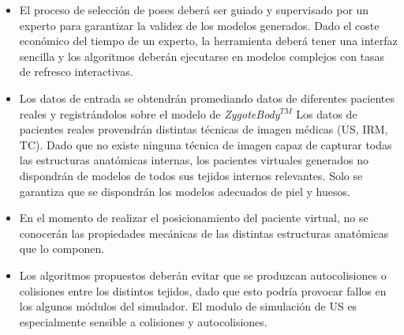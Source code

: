 \begin{itemize}
    \item El proceso de selección de poses deberá ser guiado y supervisado por un experto para garantizar la validez de los modelos generados. Dado el coste económico del tiempo de un experto, la herramienta deberá tener una interfaz sencilla y los algoritmos deberán ejecutarse en modelos complejos con tasas de refresco interactivas.
    \item Los datos de entrada se obtendrán promediando datos de diferentes pacientes reales y registrándolos sobre el modelo de \emph{ZygoteBody}$^{TM}$ \cite{kelc2012zygote} Los datos de pacientes reales provendrán distintas técnicas de imagen médicas (\ac{US}, \ac{IRM}, \ac{TC}). Dado que no existe ninguna técnica de imagen capaz de capturar todas las estructuras anatómicas internas, los pacientes virtuales generados no dispondrán de modelos de todos sus tejidos internos relevantes. Solo se garantiza que se dispondrán los modelos adecuados de piel y huesos. 
    \item En el momento de realizar el posicionamiento del paciente virtual, no se conocerán las propiedades mecánicas de las distintas estructuras anatómicas que lo componen.
    \item Los algoritmos propuestos deberán evitar que se produzcan autocolisiones o colisiones entre los distintos tejidos, dado que esto podría provocar fallos en los algunos módulos del simulador. El modulo de simulación de \ac{US} es especialmente sensible a colisiones y autocolisiones.

\end{itemize}
